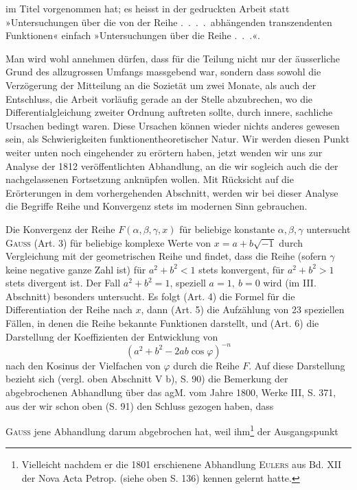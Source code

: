 im Titel vorgenommen hat; es heisst in der gedruckten Arbeit statt »Untersuchungen
über die von der Reihe \mbox{.\ .\ .\ .}\ abhängenden transzendenten Funktionen«
einfach »Untersuchungen über die Reihe \mbox{.\ .\ .}«.
\par
Man wird wohl annehmen dürfen, dass für die Teilung nicht nur der
äusserliche Grund des allzugrossen Umfangs massgebend war, sondern dass
sowohl die Verzögerung der Mitteilung an die Sozietät um zwei Monate, als
auch der Entschluss, die Arbeit vorläufig gerade an der Stelle abzubrechen,
wo die Differentialgleichung zweiter Ordnung auftreten sollte, durch innere,
sachliche Ursachen bedingt waren. Diese Ursachen können wieder nichts anderes
gewesen sein, als Schwierigkeiten funktionentheoretischer Natur. Wir
werden diesen Punkt weiter unten noch eingehender zu erörtern haben, jetzt
wenden wir uns zur Analyse der 1812 veröffentlichten Abhandlung, an die
wir sogleich auch die der nachgelassenen Fortsetzung anknüpfen wollen. Mit
Rücksicht auf die Erörterungen in dem vorhergehenden Abschnitt, werden wir
bei dieser Analyse die Begriffe Reihe und Konvergenz stets im modernen Sinn
gebrauchen.
\par
Die Konvergenz der Reihe \(F(\alpha,\beta,\gamma,x)\) für beliebige konstante \(\alpha,\beta,\gamma\)
untersucht \textsc{Gauss} (Art. 3) für beliebige komplexe Werte von \(x=a+b\sqrt{-1}\)
durch Vergleichung mit der geometrischen Reihe und findet, dass die Reihe
(sofern \(\gamma\) keine negative ganze Zahl ist) für \(a^2+b^2<1\) stets konvergent, für
\(a^2+b^2>1\) stets divergent ist. Der Fall \(a^2+b^2=1\), speziell \(a=1,\ b=0\)
wird (im III. Abschnitt) besonders untersucht. Es folgt (Art. 4) die Formel
für die Differentiation der Reihe nach \(x\), dann (Art. 5) die Aufzählung von
23 speziellen Fällen, in denen die Reihe bekannte Funktionen darstellt, und
(Art. 6) die Darstellung der Koeffizienten der Entwicklung von
\[
(a^2+b^2-2ab\cos\varphi)^{-n}
\]
nach den Kosinus der Vielfachen von \(\varphi\) durch die Reihe \(F\). Auf diese
Darstellung bezieht sich (vergl. oben Abschnitt V b), S. 90) die Bemerkung
der abgebrochenen Abhandlung über das agM. vom Jahre 1800, Werke III,
S. 371, aus der wir schon oben (S. 91) den Schluss gezogen haben, dass\par
\clearpage{}
\noindent \textsc{Gauss} jene Abhandlung darum abgebrochen hat, weil ihm\footnote{Vielleicht nachdem er die 1801 erschienene Abhandlung \textsc{Eulers} aus Bd. XII der Nova Acta Petrop. (siehe oben S. 136) kennen gelernt hatte.} der Ausgangspunkt
